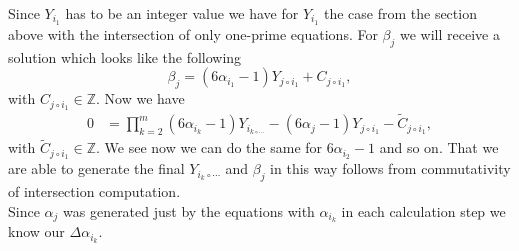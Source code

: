 \documentclass{amsart}
\begin{document}
Since $Y_{i_{1}}$ has to be an integer value we have for $Y_{i_{1}}$ the case from the section above with the intersection of only one-prime equations. For $\beta_{j}$ we will receive a solution which looks like the following
\begin{equation}
	\beta_{j} = \left(6\alpha_{i_{1}} - 1\right)Y_{j \circ i_{1}} + C_{j \circ i_{1}},
\label{eq:gen_solYji1}\end{equation}
with $C_{j \circ i_{1}} \in \mathbb{Z}$. Now we have
\begin{equation}\begin{split}
	0 & = \prod_{k=2}^{m}\left(6\alpha_{i_{k}} - 1\right)Y_{i_{k\circ\cdots}} - \left(6\alpha_{j} - 1\right)Y_{j \circ i_{1}} - \tilde{C}_{j \circ i_{1}},
\end{split}\label{eq:moreprimes_s2}\end{equation}
with $\tilde{C}_{j \circ i_{1}} \in \mathbb{Z}$. We see now we can do the same for $6\alpha_{i_{2}} - 1$ and so on. That we are able to generate the final $Y_{i_{k}\circ \cdots}$ and $\beta_{j}$ in this way follows from commutativity of intersection computation.\\
Since $\alpha_{j}$ was generated just by the equations with $\alpha_{i_{k}}$ in each calculation step we know our $\Delta \alpha_{i_{k}}$.\\
\end{document}
